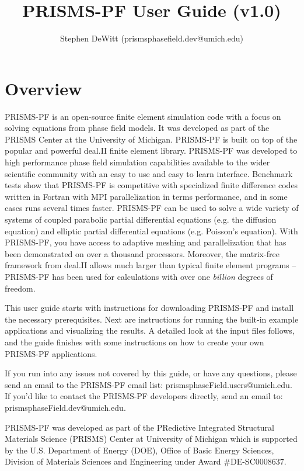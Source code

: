 \documentclass[10pt]{article} %
\title{PRISMS-PF User Guide (v1.0)}
\author{Stephen DeWitt (prismsphasefield.dev@umich.edu)}
\begin{document}
\maketitle

\tableofcontents

\clearpage

\section{Overview}
PRISMS-PF is an open-source finite element simulation code with a focus on solving equations from phase field models. It was developed as part of the PRISMS Center at the University of Michigan. PRISMS-PF is built on top of the popular and powerful deal.II finite element library. PRISMS-PF was developed to high performance phase field simulation capabilities available to the wider scientific community with an easy to use and easy to learn interface. Benchmark tests show that PRISMS-PF is competitive with specialized finite difference codes written in Fortran with MPI parallelization in terms performance,  and in some cases runs several times faster. PRISMS-PF can be used to solve a wide variety of systems of coupled parabolic partial differential equations (e.g. the diffusion equation) and elliptic partial differential equations (e.g. Poisson's equation). With PRISMS-PF, you have access to adaptive meshing and parallelization that has been demonstrated on over a thousand processors. Moreover, the matrix-free framework from deal.II allows much larger than typical finite element programs -- PRISMS-PF has been used for calculations with over one \emph{billion} degrees of freedom.

This user guide starts with instructions for downloading PRISMS-PF and install the necessary prerequisites. Next are instructions for running the built-in example applications and visualizing the results. A detailed look at the input files follows, and the guide finishes with some instructions on how to create your own PRISMS-PF applications.

If you run into any issues not covered by this guide, or have any questions, please send an email to the PRISMS-PF email list: prismsphaseField.users@umich.edu. If you'd like to contact the PRISMS-PF developers directly, send an email to: prismsphaseField.dev@umich.edu.

PRISMS-PF was developed as part of the PRedictive Integrated Structural Materials Science (PRISMS) Center at University of Michigan which is supported by the U.S. Department of Energy (DOE), Office of Basic Energy Sciences, Division of Materials Sciences and Engineering under Award \#DE-SC0008637.
\end{document}
